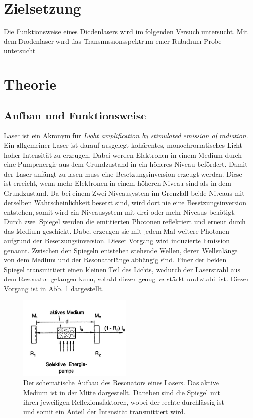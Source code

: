 \section{Zielsetzung}

Die Funktionsweise eines Diodenlasers wird im folgenden Versuch untersucht. Mit dem Diodenlaser wird das Transmissionsspektrum einer Rubidium-Probe untersucht. 

\section{Theorie}

\subsection{Aufbau und Funktionsweise}
Laser ist ein Akronym für \textit{Light amplification by stimulated emission of radiation}.
Ein allgemeiner Laser ist darauf ausgelegt kohärentes, monochromatisches Licht hoher Intensität zu erzeugen. Dabei werden Elektronen in einem Medium durch eine Pumpenergie aus dem Grundzustand in ein höheres Niveau befördert. Damit der Laser anfängt zu lasen muss eine Besetzungsinversion erzeugt werden. Diese ist erreicht, wenn mehr Elektronen in einem höheren Niveau sind als in dem Grundzustand. Da bei einem Zwei-Niveausystem im Grenzfall beide Niveaus mit derselben Wahrscheinlichkeit besetzt sind, wird dort nie eine Besetzungsinversion entstehen, somit wird ein Niveausystem mit drei oder mehr Niveaus benötigt. Durch zwei Spiegel werden die emittierten Photonen reflektiert und erneut durch das Medium geschickt. Dabei erzeugen sie mit jedem Mal weitere Photonen aufgrund der Besetzungsinversion. Dieser Vorgang wird induzierte Emission genannt. Zwischen den Spiegeln entstehen stehende Wellen, deren Wellenlänge von dem Medium und der Resonatorlänge abhängig sind. 
Einer der beiden Spiegel transmittiert einen kleinen Teil des Lichts, wodurch der Laserstrahl aus dem Resonator gelangen kann, sobald dieser genug verstärkt und stabil ist. Dieser Vorgang ist in Abb. \ref{abb:laser} dargestellt.

\begin{figure}
    \centering
    \includegraphics[width=0.5\textwidth]{pics/demtroeder.jpg}
    \caption{Der schematische Aufbau des Resonators eines Lasers. Das aktive Medium ist in der Mitte dargestellt. Daneben sind die Spiegel mit ihren jeweiligen Reflexionsfaktoren, wobei der rechte durchlässig ist und somit ein Anteil der Intensität transmittiert wird. \cite{demtroeder}}
    \label{abb:laser}
\end{figure}

